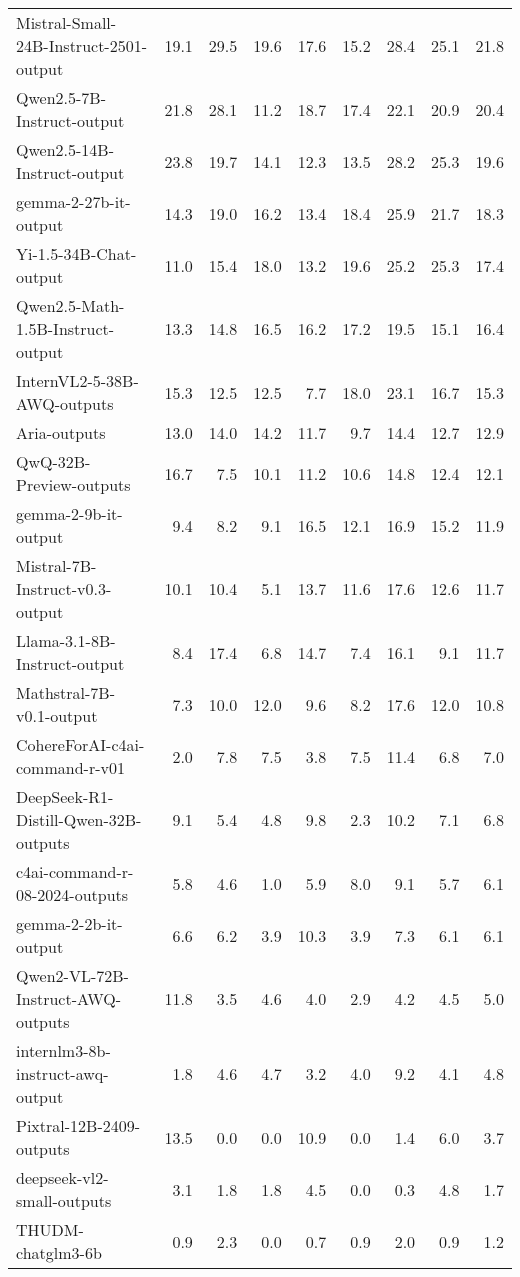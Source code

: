 \begin{table*}[t]
\begin{tabularx}{\linewidth}{l r r r r r r r r }
Mistral-Small-24B-Instruct-2501-output & 19.1 & 29.5 & 19.6 & 17.6 & 15.2 & 28.4 & 25.1 & 21.8 \\
Qwen2.5-7B-Instruct-output & 21.8 & 28.1 & 11.2 & 18.7 & 17.4 & 22.1 & 20.9 & 20.4 \\
Qwen2.5-14B-Instruct-output & 23.8 & 19.7 & 14.1 & 12.3 & 13.5 & 28.2 & 25.3 & 19.6 \\
gemma-2-27b-it-output & 14.3 & 19.0 & 16.2 & 13.4 & 18.4 & 25.9 & 21.7 & 18.3 \\
Yi-1.5-34B-Chat-output & 11.0 & 15.4 & 18.0 & 13.2 & 19.6 & 25.2 & 25.3 & 17.4 \\
Qwen2.5-Math-1.5B-Instruct-output & 13.3 & 14.8 & 16.5 & 16.2 & 17.2 & 19.5 & 15.1 & 16.4 \\
InternVL2-5-38B-AWQ-outputs & 15.3 & 12.5 & 12.5 & 7.7 & 18.0 & 23.1 & 16.7 & 15.3 \\
Aria-outputs & 13.0 & 14.0 & 14.2 & 11.7 & 9.7 & 14.4 & 12.7 & 12.9 \\
QwQ-32B-Preview-outputs & 16.7 & 7.5 & 10.1 & 11.2 & 10.6 & 14.8 & 12.4 & 12.1 \\
gemma-2-9b-it-output & 9.4 & 8.2 & 9.1 & 16.5 & 12.1 & 16.9 & 15.2 & 11.9 \\
Mistral-7B-Instruct-v0.3-output & 10.1 & 10.4 & 5.1 & 13.7 & 11.6 & 17.6 & 12.6 & 11.7 \\
Llama-3.1-8B-Instruct-output & 8.4 & 17.4 & 6.8 & 14.7 & 7.4 & 16.1 & 9.1 & 11.7 \\
Mathstral-7B-v0.1-output & 7.3 & 10.0 & 12.0 & 9.6 & 8.2 & 17.6 & 12.0 & 10.8 \\
CohereForAI-c4ai-command-r-v01 & 2.0 & 7.8 & 7.5 & 3.8 & 7.5 & 11.4 & 6.8 & 7.0 \\
DeepSeek-R1-Distill-Qwen-32B-outputs & 9.1 & 5.4 & 4.8 & 9.8 & 2.3 & 10.2 & 7.1 & 6.8 \\
c4ai-command-r-08-2024-outputs & 5.8 & 4.6 & 1.0 & 5.9 & 8.0 & 9.1 & 5.7 & 6.1 \\
gemma-2-2b-it-output & 6.6 & 6.2 & 3.9 & 10.3 & 3.9 & 7.3 & 6.1 & 6.1 \\
Qwen2-VL-72B-Instruct-AWQ-outputs & 11.8 & 3.5 & 4.6 & 4.0 & 2.9 & 4.2 & 4.5 & 5.0 \\
internlm3-8b-instruct-awq-output & 1.8 & 4.6 & 4.7 & 3.2 & 4.0 & 9.2 & 4.1 & 4.8 \\
Pixtral-12B-2409-outputs & 13.5 & 0.0 & 0.0 & 10.9 & 0.0 & 1.4 & 6.0 & 3.7 \\
deepseek-vl2-small-outputs & 3.1 & 1.8 & 1.8 & 4.5 & 0.0 & 0.3 & 4.8 & 1.7 \\
THUDM-chatglm3-6b & 0.9 & 2.3 & 0.0 & 0.7 & 0.9 & 2.0 & 0.9 & 1.2 \\

\end{tabularx}
\end{table*}
